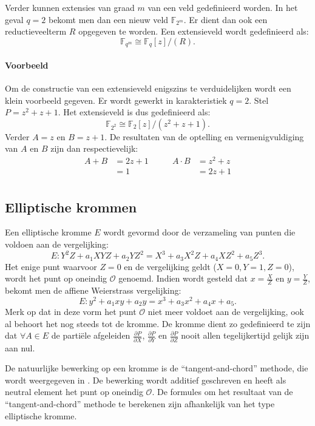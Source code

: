 Verder kunnen extensies van graad $m$ van een veld gedefinieerd worden. In het geval $q = 2$ bekomt men dan een nieuw veld $\mathbb{F}_{2^m}$. Er dient dan ook een reductieveelterm $R$ opgegeven te worden. Een extensieveld wordt gedefinieerd als:
\[\mathbb{F}_{q^m} \cong \mathbb{F}_q [z] / (R). \]

\paragraph{Voorbeeld} Om de constructie van een extensieveld enigszins te verduidelijken wordt een klein voorbeeld gegeven. Er wordt gewerkt in karakteristiek $q = 2$. Stel $P = z^2 + z + 1$. Het extensieveld is dus gedefinieerd als:
\[\mathbb{F}_{2^2} \cong \mathbb{F}_2 [z] / (z^2 + z + 1). \]
Verder $A = z$ en $B = z + 1$. De resultaten van de optelling en vermenigvuldiging van $A$ en $B$ zijn dan respectievelijk:
\[\begin{aligned}
A + B &= 2z + 1 \qquad & A \cdot B &= z^2 + z\\
&= 1	& &= 2z + 1\\
\end{aligned}\]

\subsection{Elliptische krommen}

Een elliptische kromme $E$ wordt gevormd door de verzameling van punten die voldoen aan de vergelijking:
\[E: Y^2 Z + a_1 XYZ + a_2 Y Z^2 = X^3 + a_3 X^2 Z + a_4 X Z^2 + a_5 Z^3.\]
Het enige punt waarvoor $Z = 0$ en de vergelijking geldt ($X = 0,  Y = 1, Z = 0$), wordt het punt op oneindig $\mathcal{O}$ genoemd. Indien wordt gesteld dat $x = \frac{X}{Z}$ en $y = \frac{Y}{Z}$, bekomt men de affiene Weierstrass vergelijking:
\[E: y^2 + a_1 xy + a_2 y = x^3 + a_3 x^2 + a_4 x + a_5.\]
Merk op dat in deze vorm het punt $\mathcal{O}$ niet meer voldoet aan de vergelijking, ook al behoort het nog steeds tot de kromme. De kromme dient zo gedefinieerd te zijn dat $\forall A \in E$ de parti\"ele afgeleiden $\frac{\partial P}{\partial X}$, $\frac{\partial P}{\partial Y}$ en $\frac{\partial P}{\partial Z}$ nooit allen tegelijkertijd gelijk zijn aan nul.

De natuurlijke bewerking op een kromme is de ``tangent-and-chord'' methode, die wordt weergegeven in . De bewerking wordt additief geschreven en heeft als neutral element het punt op oneindig $\mathcal{O}$. De formules om het resultaat van de ``tangent-and-chord'' methode te berekenen zijn afhankelijk van het type elliptische kromme.

